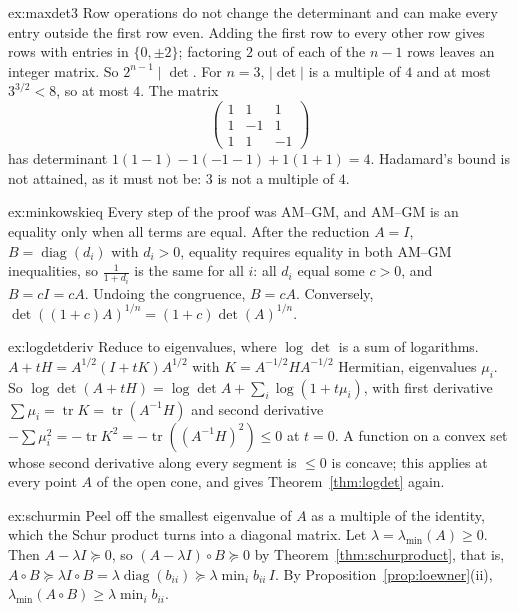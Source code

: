 \begin{solution}{ex:maxdet3}
\idea Row operations do not change the determinant and can make every entry outside the first row even.
\writeup Adding the first row to every other row gives rows with entries in $\{0,\pm2\}$; factoring $2$ out of each of the $n-1$ rows
leaves an integer matrix. So $2^{n-1}\mid\det$. For $n=3$, $|\det|$ is a multiple of $4$ and at most $3^{3/2}<8$, so at most $4$. The matrix
\[
\begin{pmatrix}1&1&1\\1&-1&1\\1&1&-1\end{pmatrix}
\]
has determinant $1(1-1)-1(-1-1)+1(1+1)=4$. Hadamard's bound is not attained, as it must not be: $3$ is not a multiple of $4$.
\end{solution}

\begin{solution}{ex:minkowskieq}
\idea Every step of the proof was AM--GM, and AM--GM is an equality only when all terms are equal.
\writeup After the reduction $A=I$, $B=\operatorname{diag}(d_i)$ with $d_i>0$, equality requires equality in both AM--GM inequalities,
so $\frac{1}{1+d_i}$ is the same for all $i$: all $d_i$ equal some $c>0$, and $B=cI=cA$. Undoing the congruence, $B=cA$. Conversely,
$\det((1+c)A)^{1/n}=(1+c)\det(A)^{1/n}$.
\end{solution}

\begin{solution}{ex:logdetderiv}
\idea Reduce to eigenvalues, where $\log\det$ is a sum of logarithms.
\writeup $A+tH=A^{1/2}(I+tK)A^{1/2}$ with $K=A^{-1/2}HA^{-1/2}$ Hermitian, eigenvalues $\mu_i$. So $\log\det(A+tH)=\log\det A+\sum_i\log(1+
t\mu_i)$, with first derivative $\sum\mu_i=\operatorname{tr}K=\operatorname{tr}(A^{-1}H)$ and second derivative $-\sum\mu_i^2=-\operatorname{tr}
K^2=-\operatorname{tr}((A^{-1}H)^2)\le0$ at $t=0$. A function on a convex set whose second derivative along every segment is $\le0$ is
concave; this applies at every point $A$ of the open cone, and gives Theorem~\ref{thm:logdet} again.
\end{solution}

\begin{solution}{ex:schurmin}
\idea Peel off the smallest eigenvalue of $A$ as a multiple of the identity, which the Schur product turns into a diagonal matrix.
\writeup Let $\lambda=\lambda_{\min}(A)\ge0$. Then $A-\lambda I\succeq0$, so $(A-\lambda I)\circ B\succeq0$ by Theorem~\ref{thm:schurproduct},
that is, $A\circ B\succeq\lambda I\circ B=\lambda\operatorname{diag}(b_{ii})\succeq\lambda\min_ib_{ii}\,I$. By Proposition~\ref{prop:loewner}(ii),
$\lambda_{\min}(A\circ B)\ge\lambda\min_ib_{ii}$.
\end{solution}

